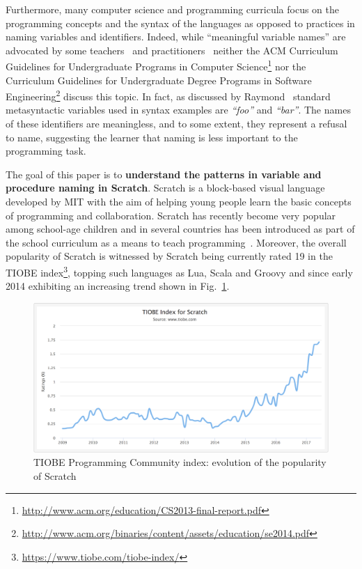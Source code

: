 \documentclass[conference]{IEEEtran}
\newcommand{\quotes}[1]{\textit{``#1''}}
\begin{document}
Furthermore, many computer science and programming curricula focus on the programming concepts and the syntax of the languages as opposed to practices in naming variables and identifiers. 
Indeed, while ``meaningful variable names'' are advocated by some teachers~\cite{Kato2016, hermans_aivaloglou} and practitioners~\cite{Rother} neither the ACM Curriculum Guidelines for Undergraduate Programs in Computer Science\footnote{\url{http://www.acm.org/education/CS2013-final-report.pdf}} nor the Curriculum Guidelines for Undergraduate Degree Programs in Software Engineering\footnote{\url{http://www.acm.org/binaries/content/assets/education/se2014.pdf}} discuss this topic.
In fact, as discussed by Raymond~\cite{Raymond} standard metasyntactic variables used in syntax examples are \quotes{foo} and \quotes{bar}.
The names of these identifiers are meaningless, and to some extent, they represent a refusal to name, suggesting the learner that naming is less important %
to the programming task. 


The goal of this paper is to \textbf{understand the patterns in variable and procedure naming in Scratch}. Scratch is a block-based visual language developed by MIT with the aim of helping young people learn the basic concepts of programming and collaboration. 
Scratch has recently become very popular among school-age children and in several countries has been introduced as part of the school curriculum as a means to teach programming~\cite{vanZyl,SaezLopez}.
Moreover, the overall popularity of Scratch is witnessed by Scratch being currently rated 19 in the TIOBE index\footnote{\url{https://www.tiobe.com/tiobe-index/}}, topping such languages as Lua, Scala and Groovy and since early 2014 exhibiting an increasing trend shown in Fig.~\ref{fig:tiobe}.
\begin{figure}
  \begin{center}
  \includegraphics[scale=0.25]{fig/tiobe}
  \caption{TIOBE Programming Community index: evolution of the popularity of Scratch}
  \label{fig:tiobe}
  \end{center}
\end{figure} 
\end{document}
